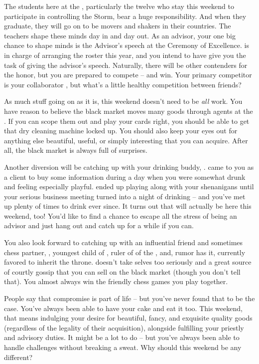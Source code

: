 \documentclass[char]{GL2020}
\begin{document}
The students here at the \pSc{}, particularly the twelve who stay this weekend to participate in controlling the Storm, bear a huge responsibility. And when they graduate, they will go on to be movers and shakers in their countries. The teachers shape these minds day in and day out. As an advisor, your one big chance to shape minds is the Advisor's speech at the Ceremony of Excellence. \cMusic{} is in charge of arranging the roster this year, and you intend to have \cMusic{\them} give you the task of giving the advisor's speech. Naturally, there will be other contenders for the honor, but you are prepared to compete -- and win. Your primary competitor is your collaborator \cCurse{}, but what's a little healthy competition between friends?

As much stuff going on as it is, this weekend doesn't need to be \emph{all} work. You have reason to believe the black market moves many goods through agents at the \pSc{}. If you can scope them out and play your cards right, you should be able to get that dry cleaning machine locked up. You should also keep your eyes out for anything else beautiful, useful, or simply interesting that you can acquire. After all, the black market is always full of surprises.

Another diversion will be catching up with your drinking buddy, \cWildCard{\full}. \cWildCard{} came to you as a client to buy some information during a day when you were somewhat drunk and feeling especially playful. \cWildCard{} ended up playing along with your shenanigans until your serious business meeting turned into a night of drinking -- and you've met up plenty of times to drink ever since. It turns out that \cWildCard{} will actually be here this weekend, too! You'd like to find a chance to escape all the stress of being an advisor and just hang out and catch up for a while if you can. 

You also look forward to catching up with an influential friend and sometimes chess partner, \cPrince{\full}, youngest child of \cQueen{\full}, ruler of of the \pFarm{}, and, rumor has it, currently favored to inherit the throne. \cPrince{} doesn't take \cPrince{\them}selves too seriously and \cPrince{\are} a great source of courtly gossip that you can sell on the black market (though you don't tell \cPrince{\them} that). You almost always win the friendly chess games you play together.

People say that compromise is part of life -- but you've never found that to be the case. You've always been able to have your cake and eat it too. This weekend, that means indulging your desire for beautiful, fancy, and exquisite quality goods (regardless of the legality of their acquisition), alongside fulfilling your priestly and advisory duties. It might be a lot to do -- but you've always been able to handle challenges without breaking a sweat. Why should this weekend be any different?
\end{document}
